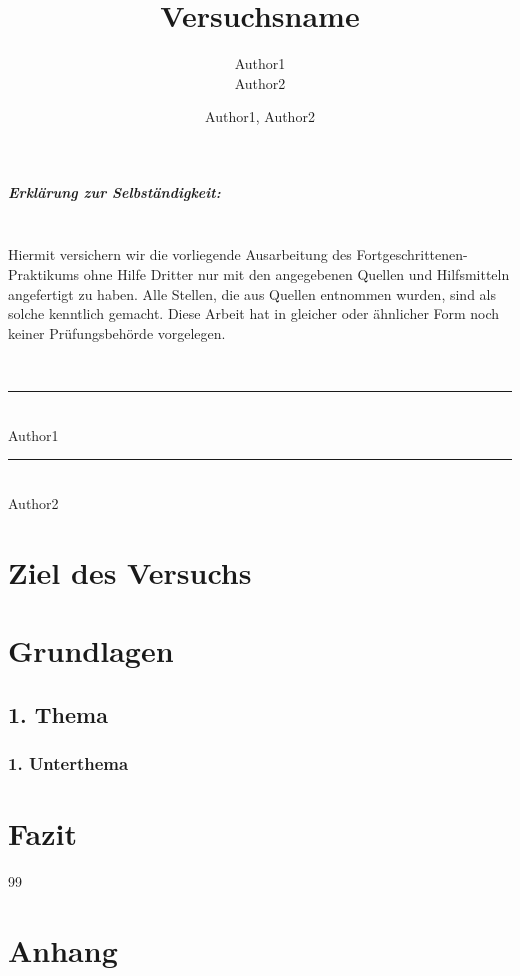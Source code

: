 \documentclass[colorback,accentcolor=tud1c,linedtoc,bibtotoc]{tudreport}
\title{Versuchsname}
\subtitle{Author1  \\ Author2 
}
\author{Author1, Author2}
\begin{document}
\maketitle

\paragraph{Erklärung zur Selbständigkeit:} \ \\
Hiermit versichern wir die vorliegende Ausarbeitung des Fortgeschrittenen-Praktikums ohne Hilfe Dritter nur mit den angegebenen Quellen und Hilfsmitteln angefertigt zu haben. Alle Stellen, die aus Quellen entnommen wurden, sind als solche kenntlich gemacht. Diese Arbeit hat in gleicher oder ähnlicher Form noch keiner Prüfungsbehörde vorgelegen.

\begin{center} \
	\linebreak[1]\linebreak[1]\linebreak[1]\linebreak[1]
	\rule{5cm}{0.1mm}\\
	Author1
	\linebreak[1]\linebreak[1]\linebreak[1]\linebreak[1]\linebreak[1]
	\rule{5cm}{0.1mm}\\
	Author2\\
\end{center}

\tableofcontents

\chapter*{Ziel des Versuchs}

\chapter{Grundlagen}
\section{1. Thema}
\subsection{1. Unterthema}

\chapter{Fazit}
\newpage
\begin{thebibliography}{99}

\end{thebibliography}
  
\newpage
  
\chapter*{Anhang}
\end{document}
